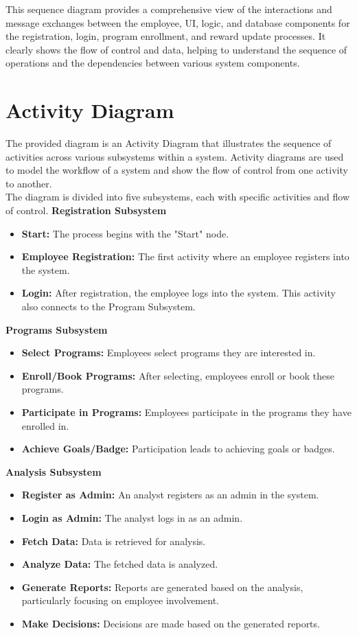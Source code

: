 This sequence diagram provides a comprehensive view of the interactions and message exchanges between the employee, UI, logic, and database components for the registration, login, program enrollment, and reward update processes. It clearly shows the flow of control and data, helping to understand the sequence of operations and the dependencies between various system components. 

\section{Activity Diagram}
The provided diagram is an Activity Diagram that illustrates the sequence of activities across various subsystems within a system. Activity diagrams are used to model the workflow of a system and show the flow of control from one activity to another. 
\\
The diagram is divided into five subsystems, each with specific activities and flow of control. 
\leavevmode
\newline
\textbf{Registration Subsystem }
\begin{itemize}
    \item \textbf{Start: }The process begins with the "Start" node. 
    \item \textbf{Employee Registration: }The first activity where an employee registers into the system.
    \item \textbf{Login: }After registration, the employee logs into the system. This activity also connects to the Program Subsystem. 
\end{itemize}
\leavevmode
\newline
\textbf{Programs  Subsystem }
\begin{itemize}
    \item \textbf{Select Programs: }Employees select programs they are interested in.  
    \item \textbf{Enroll/Book Programs: }After selecting, employees enroll or book these programs. 
    \item \textbf{Participate in Programs: }Employees participate in the programs they have enrolled in.  
    \item \textbf{Achieve Goals/Badge: }Participation leads to achieving goals or badges. 
\end{itemize}
\leavevmode
\newline
\textbf{Analysis Subsystem }
\begin{itemize}
    \item \textbf{Register as Admin: }An analyst registers as an admin in the system.
    \item \textbf{Login as Admin: }The analyst logs in as an admin. 
    \item \textbf{Fetch Data: }Data is retrieved for analysis. 
    \item \textbf{Analyze Data: }The fetched data is analyzed.
    \item \textbf{Generate Reports: }Reports are generated based on the analysis, particularly focusing on employee involvement.
    \item \textbf{Make Decisions: }Decisions are made based on the generated reports. 
\end{itemize}

